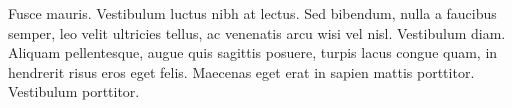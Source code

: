 Fusce mauris. Vestibulum luctus nibh at lectus. Sed bibendum, nulla a faucibus semper, leo velit ultricies tellus, ac venenatis arcu wisi vel nisl. Vestibulum diam. Aliquam pellentesque, augue quis sagittis posuere, turpis lacus congue quam, in hendrerit risus eros eget felis. Maecenas eget erat in sapien mattis porttitor. Vestibulum porttitor.

%
%
%
%
%
%
%
%
